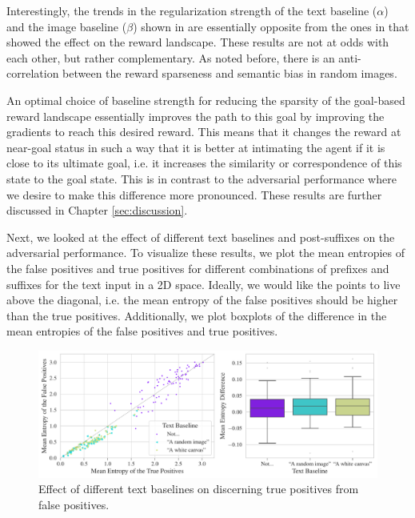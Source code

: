 Interestingly, the trends in the regularization strength of the text baseline (\(\alpha\)) and the image baseline (\(\beta\)) shown in  are essentially opposite from the ones in  that showed the effect on the reward landscape.
These results are not at odds with each other, but rather complementary. 
As noted before, there is an anti-correlation between the reward sparseness and semantic bias in random images.

An optimal choice of baseline strength for reducing the sparsity of the goal-based reward landscape essentially improves the path to this goal by improving the gradients to reach this desired reward.
This means that it changes the reward at near-goal status in such a way that it is better at intimating the agent if it is close to its ultimate goal, i.e. it increases the similarity or correspondence of this state to the goal state.
This is in contrast to the adversarial performance where we desire to make this difference more pronounced.
These results are further discussed in Chapter \ref{sec:discussion}.

Next, we looked at the effect of different text baselines and post-suffixes on the adversarial performance.
To visualize these results, we plot the mean entropies of the false positives and true positives for different combinations of prefixes and suffixes for the text input in a 2D space.
Ideally, we would like the points to live above the diagonal, i.e. the mean entropy of the false positives should be higher than the true positives.
Additionally, we plot boxplots of the difference in the mean entropies of the false positives and true positives.

\begin{figure}[H]
    \centering
    \includegraphics[width=\textwidth]{images/baseline_adversarial_2.pdf}
    \caption{Effect of different text baselines on discerning true positives from false positives.}
    \label{fig:baseline-adversarial}
\end{figure}

